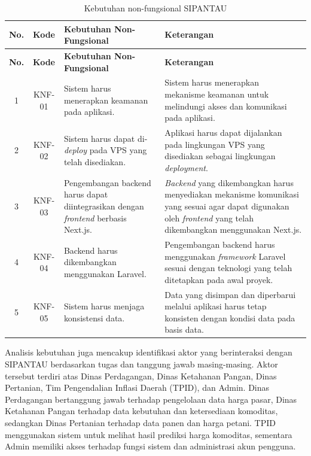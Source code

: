 \begin{longtable}{|c|c|p{5.0cm}|p{5.0cm}|}
    \caption{Kebutuhan non-fungsional SIPANTAU}
    \label{tab:kebutuhan-nonfungsional} \\
    \hline
    \textbf{No.} &
    \textbf{Kode} &
    \textbf{Kebutuhan Non-Fungsional} &
    \textbf{Keterangan} \\
    \hline
    \endfirsthead

    \hline
    \textbf{No.} &
    \textbf{Kode} &
    \textbf{Kebutuhan Non-Fungsional} &
    \textbf{Keterangan} \\
    \hline
    \endhead

    1 &
    KNF-01 &
    Sistem harus menerapkan keamanan pada aplikasi. &
    Sistem harus menerapkan mekanisme keamanan untuk melindungi akses dan komunikasi pada aplikasi. \\
    \hline

    2 &
    KNF-02 &
    Sistem harus dapat di-\textit{deploy} pada VPS yang telah disediakan. &
    Aplikasi harus dapat dijalankan pada lingkungan VPS yang disediakan sebagai lingkungan \textit{deployment}. \\
    \hline

    3 &
    KNF-03 &
    Pengembangan backend harus dapat diintegrasikan dengan \textit{frontend} berbasis Next.js. &
    \textit{Backend} yang dikembangkan harus menyediakan mekanisme komunikasi yang sesuai agar dapat digunakan oleh \textit{frontend} yang telah dikembangkan menggunakan Next.js. \\
    \hline

    4 &
    KNF-04 &
    Backend harus dikembangkan menggunakan Laravel. &
    Pengembangan backend harus menggunakan \textit{framework} Laravel sesuai dengan teknologi yang telah ditetapkan pada awal proyek. \\
    \hline

    5 &
    KNF-05 &
    Sistem harus menjaga konsistensi data. &
    Data yang disimpan dan diperbarui melalui aplikasi harus tetap konsisten dengan kondisi data pada basis data. \\
    \hline

\end{longtable}

Analisis kebutuhan juga mencakup identifikasi aktor yang berinteraksi dengan SIPANTAU berdasarkan tugas dan tanggung jawab masing-masing. Aktor tersebut terdiri atas Dinas Perdagangan, Dinas Ketahanan Pangan, Dinas Pertanian, Tim Pengendalian Inflasi Daerah (TPID), dan Admin. Dinas Perdagangan bertanggung jawab terhadap pengelolaan data harga pasar, Dinas Ketahanan Pangan terhadap data kebutuhan dan ketersediaan komoditas, sedangkan Dinas Pertanian terhadap data panen dan harga petani. TPID menggunakan sistem untuk melihat hasil prediksi harga komoditas, sementara Admin memiliki akses terhadap fungsi sistem dan administrasi akun pengguna.

